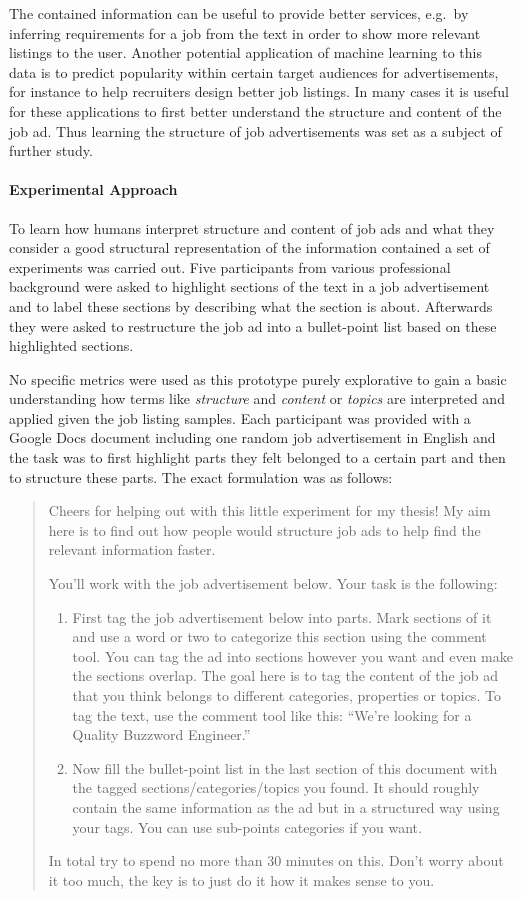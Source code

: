 The contained information can be useful to provide better services, e.g.\ by inferring requirements for a job from the text in order to show more relevant listings to the user. Another potential application of machine learning to this data is to predict popularity within certain target audiences for advertisements, for instance to help recruiters design better job listings. In many cases it is useful for these applications to first better understand the structure and content of the job ad. Thus learning the structure of job advertisements was set as a subject of further study.


\paragraph{Experimental Approach}
\label{par:Experimental Approach and Metrics}

To learn how humans interpret structure and content of job ads and what they consider a good structural representation of the information contained a set of experiments was carried out. Five participants from various professional background were asked to highlight sections of the text in a job advertisement and to label these sections by describing what the section is about. Afterwards they were asked to restructure the job ad into a bullet-point list based on these highlighted sections.

No specific metrics were used as this prototype purely explorative to gain a basic understanding how terms like \emph{structure} and \emph{content} or \emph{topics} are interpreted and applied given the job listing samples. Each participant was provided with a \gls{Google Docs} document including one random job advertisement in English and the task was to first highlight parts they felt belonged to a certain part and then to structure these parts. The exact formulation was as follows:

\blockquote{Cheers for helping out with this little experiment for my thesis! My aim here is to find out how people would structure job ads to help find the relevant information faster.

You'll work with the job advertisement below. Your task is the following:
\begin{enumerate}
  \item First tag the job advertisement below into parts. Mark sections of it and use a word or two to categorize this section using the comment tool. You can tag the ad into sections however you want and even make the sections overlap. The goal here is to tag the content of the job ad that you think belongs to different categories, properties or topics. To tag the text, use the comment tool like this: ``We're looking for a Quality Buzzword Engineer.''
  \item Now fill the bullet-point list in the last section of this document with the tagged sections/categories/topics you found. It should roughly contain the same information as the ad but in a structured way using your tags. You can use sub-points categories if you want.
\end{enumerate}
In total try to spend no more than 30 minutes on this. Don't worry about it too much, the key is to just do it how it makes sense to you.}

